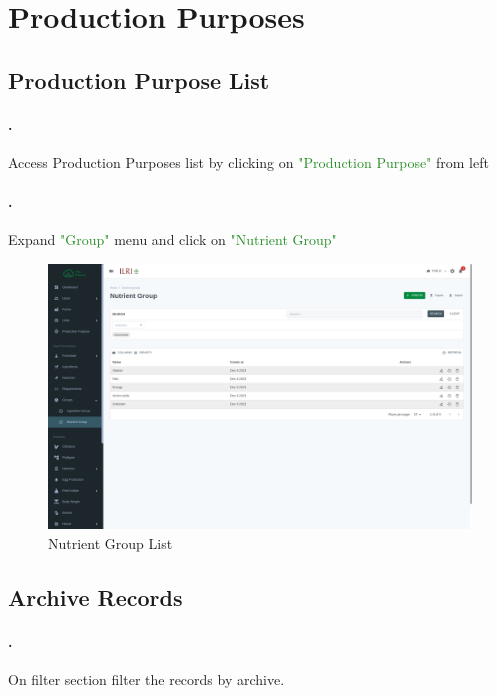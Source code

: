 \section{Production Purposes}\label{sec:production_purpose}

\subsection{Production Purpose List}\label{sec:production_purpose_list}
\setcounter{stepcounter}{1}
\paragraph{.}Access Production Purposes list by clicking on \textcolor{ForestGreen}{"Production Purpose"} from left 
\paragraph{.}Expand \textcolor{ForestGreen}{"Group"} menu and click on \textcolor{ForestGreen}{"Nutrient Group"}
\begin{figure}[h!]
  	\includegraphics[width=15cm]{screenshots/nutrient_group_list_page.png}
  	\caption{Nutrient Group List}
  	\label{fig:nutrient_group_list_page}
\end{figure}

\subsection{Archive Records}\label{sec:nutrient_group_list_archived}
\setcounter{stepcounter}{1}
\paragraph{.}On filter section filter the records by archive.

